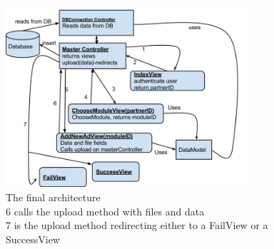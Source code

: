 \begin{itemize}
\begin{figure}[H]
\centering
\includegraphics[width=0.8\textwidth]{images/architecture_final01.png}
\caption{The final architecture\\6 calls the upload method with files and data\\
7 is the upload method redirecting either to a FailView or a SuccessView
}
\label{fig:architecture}
\end{figure}


\end{itemize}